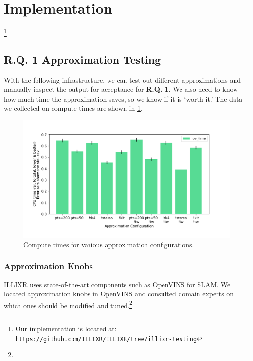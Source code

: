 \newcommand{\ILLIXRlink}[1]{\href{https://github.com/ILLIXR/ILLIXR/tree/6c25003f79ecc35b4e002615b5a05d3077851d90}{\texttt{#1}}}

\section{Implementation}

\footnote{Our implementation is located at: \href{https://github.com/ILLIXR/ILLIXR/tree/illixr-testing}{\texttt{https://github.com/ILLIXR/ILLIXR/tree/illixr-testing}}}

\subsection{R.Q. 1 Approximation Testing}

With the following infrastructure, we can test out different approximations and manually inspect the output for acceptance for \textbf{R.Q. 1}.
We also need to know how much time the approximation saves, so we know if it is `worth it.'
The data we collected on compute-times are shown in \cref{compute-times}.

\begin{figure}
  \label{compute-times}
  \caption{Compute times for various approximation configurations.}
  \includegraphics[width=\columnwidth]{times.png}
\end{figure}

\subsubsection{Approximation Knobs}

ILLIXR uses state-of-the-art components such as OpenVINS \cite{Geneva2020ICRA} for SLAM.
We located approximation knobs in OpenVINS and consulted domain experts on which ones should be modified and tuned.\footnote{
}

